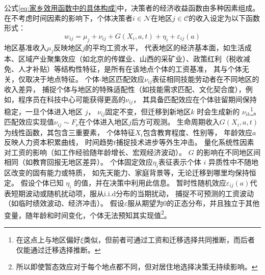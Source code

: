 \documentclass[a4paper,12pt,oneside, fontset=mac]{ctexbook} %
\begin{document}
公式\ref{eq:家乡效用函数中的具体构成}中，决策者的经济收益函数由多种因素组成。在不考虑时间因素的影响下，个体决策者$i \in \mathcal{N}$在地区$j \in \mathcal{C}$的收入设定为以下函数形式：
\begin{equation}
  w_{ij}=\mu_j + \nu_{ij} + G(X_i,a,t) + \eta_i + \varepsilon_{ij}(a)
  \label{eq:经济收益函数}
\end{equation}
地区基准收入$\mu_j$反映地区$j$的平均工资水平，
代表地区的经济基本面，如生活成本、区域产业聚集效应（如北京的传媒业、山西的采矿业）、政策红利（税收减免、人才补贴）等结构性特征，是所有在该地点个体的工资基准，
其与个体无关，仅取决于地点特征。
个体-地区匹配效应$\nu_{ij}$表征相同技能劳动者在不同地区的收入差异，
捕捉个体与地区的特殊适配性（如技能需求匹配、文化契合度），例如，程序员在科技中心可能获得更高的$\nu_{ij}$，
其具备匹配效应在个体驻留期间保持稳定，一旦个体进入地区 $j$，
$\nu_{ij}$固定不变，但迁移到新地区$k$ 时会生成新的 $\nu_{ik}$\footnote{在这点上与地区偏好$\xi$类似，但前者可通过工资和迁移选择共同推断，而后者仅能通过迁移选择推断。}。
匹配效应实现值$\nu_{ij} \sim F_\nu$在个体进入地区$j$后方可观测。
生命周期收入$G(X_i,a,t)$为线性函数，其包含三重要素，
个体特征$X_i$包含教育程度、性别等，
年龄效应$a$反映人力资本积累曲线，
时间趋势$t$捕捉技术进步等外生冲击。
量化系统性因素对工资的影响（如工作经验随年龄增长、宏观经济波动）。
$G$ 的影响在不同地区间相同（如教育回报无地区差异）。
个体固定效应$\eta_i$表征表示个体 $i$ 异质性中不随地区改变的固有能力或特质，
如先天能力、家庭背景等，无论迁移到哪里均保持恒定。
假设个体已知 $\eta_i$ 的值，并在决策中利用此信息。
暂时性随机效应$\varepsilon_{ij}(a)$代表短期波动或随机扰动项，服从i.i.d分布的当期扰动，
捕捉不可预测的工资波动（如临时绩效波动、经济冲击）。
假设$\varepsilon$服从期望为0的正态分布，并且独立于其他变量，随年龄和时间变化，个体无法预知其实现值\footnote{所以即使暂态效应对于每个地点都不同，但对居住地选择决策无持续影响。}。
\end{document}
